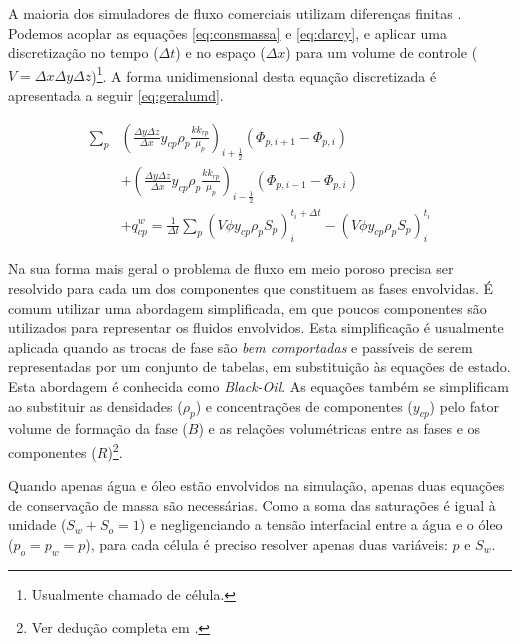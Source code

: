 \documentclass[final,5p]{elsarticle}
\numberwithin{equation}{section}
\begin{document}
        A maioria dos simuladores de fluxo comerciais utilizam diferenças finitas \cite{computer2022cmg}\cite{schlumberger2009technical}. Podemos acoplar as equações \ref{eq:consmassa} e \ref{eq:darcy}, e aplicar uma discretização no tempo ($\Delta t$) e no espaço ($\Delta x$) para um volume de controle ($V = \Delta x \Delta y \Delta z$)\footnote{Usualmente chamado de célula.}. A forma unidimensional desta equação discretizada é apresentada a seguir \ref{eq:geralumd}.

        \begin{align}
            \sum_{p} & \left( \frac{\Delta y \Delta z}{\Delta x} y_{cp} \rho_p \frac{k k_{rp}}{\mu_p} \right)_{i+\tfrac{1}{2}} (\Phi_{p,i+1} - \Phi_{p,i})  \nonumber \\
            & + \left( \frac{\Delta y \Delta z}{\Delta x} y_{cp} \rho_p \frac{k k_{rp}}{\mu_p} \right)_{i-\tfrac{1}{2}} (\Phi_{p,i-1} - \Phi_{p,i}) \nonumber \\
            & + q_{cp}^{w} = \frac{1}{\Delta t} \sum_{p} (V \phi y_{cp} \rho_p S_p)_i^{t_i+\Delta t} - (V \phi y_{cp} \rho_p S_p)_i^{t_i} \label{eq:geralumd}
        \end{align}

        Na sua forma mais geral o problema de fluxo em meio poroso precisa ser resolvido para cada um dos componentes que constituem as fases envolvidas. É comum utilizar uma abordagem simplificada, em que poucos componentes são utilizados para representar os fluidos envolvidos. Esta simplificação é usualmente aplicada quando as trocas de fase são \emph{bem comportadas} e passíveis de serem representadas por um conjunto de tabelas, em substituição às equações de estado. Esta abordagem é conhecida como \emph{Black-Oil}. As equações também se simplificam ao substituir as densidades ($\rho_p$) e concentrações de componentes ($y_{cp}$) pelo fator volume de formação da fase ($B$) e as relações volumétricas entre as fases e os componentes ($R$)\footnote{Ver dedução completa em \cite{dake1983fundamentals}.}.

        Quando apenas água e óleo estão envolvidos na simulação, apenas duas equações de conservação de massa são necessárias. Como a soma das saturações é igual à unidade ($S_w + S_o = 1$) e negligenciando a tensão interfacial entre a água e o óleo ($p_o = p_w = p$), para cada célula é preciso resolver apenas duas variáveis: $p$ e $S_w$.
\end{document}
